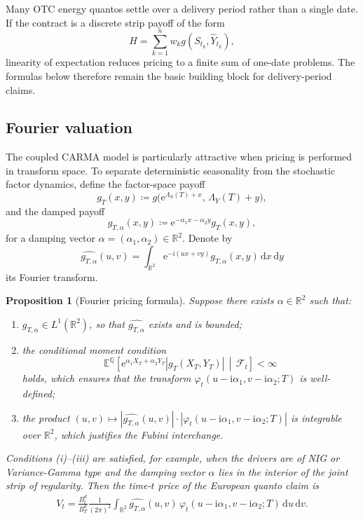 \documentclass[10pt,reqno]{amsart}
\newtheorem{proposition}[theorem]{Proposition}
\newcommand{\R}{\mathbb{R}}
\newcommand{\E}{\mathbb{E}}
\newcommand{\Q}{\mathbb{Q}}
\newcommand{\F}{\mathcal{F}}
\newcommand{\1}{\mathbbm{1}}
\newcommand{\dd}{\mathrm{d}}
\newcommand{\ii}{\mathrm{i}}
\newcommand{\ee}{\mathrm{e}}
\begin{document}
Many OTC energy quantos settle over a delivery period rather than a single date.
If the contract is a discrete strip payoff of the form
$$
H = \sum_{k=1}^n w_k g(S_{t_k},\widehat{Y}_{t_k}),
$$
linearity of expectation reduces pricing to a finite sum of one-date problems.
The formulas below therefore remain the basic building block for
delivery-period claims.

\subsection{Fourier valuation}

The coupled CARMA model is particularly attractive when pricing is performed in
transform space. To separate deterministic seasonality from the stochastic
factor dynamics, define the factor-space payoff
$$
g_T(x,y) \coloneqq g\!\bigl(\ee^{\Lambda_S(T)+x},\, \Lambda_Y(T)+y\bigr),
$$
and the damped payoff
$$
g_{T,\alpha}(x,y) \coloneqq \ee^{-\alpha_1 x-\alpha_2 y} g_T(x,y),
$$
for a damping vector $\alpha=(\alpha_1,\alpha_2)\in\R^2$. Denote by
$$
\widehat{g_{T,\alpha}}(u,v)
= \int_{\R^2} \ee^{-\ii(ux+vy)} g_{T,\alpha}(x,y)\,\dd x\,\dd y
$$
its Fourier transform.

\begin{proposition}[Fourier pricing formula]
\label{prop:fourier_pricing}
Suppose there exists $\alpha\in\R^2$ such that:
\begin{enumerate}[label=(\roman*)]
  \item $g_{T,\alpha} \in L^1(\R^2)$, so that $\widehat{g_{T,\alpha}}$
    exists and is bounded;
  \item the conditional moment condition
    $$
    \E^\Q\!\left[
      \ee^{\alpha_1 X_T + \alpha_2 Y_T}
      \left|g_T(X_T,Y_T)\right|
      \,\middle|\, \F_t
    \right] < \infty
    $$
    holds, which ensures that the transform $\varphi_t(u-\ii\alpha_1,
    v-\ii\alpha_2;T)$ is well-defined;
  \item the product $(u,v) \mapsto
    |\widehat{g_{T,\alpha}}(u,v)|\cdot|\varphi_t(u-\ii\alpha_1,v-\ii\alpha_2;T)|$
    is integrable over $\R^2$, which justifies the Fubini interchange.
\end{enumerate}
Conditions (i)--(iii) are satisfied, for example, when the drivers are of
NIG or Variance-Gamma type and the damping vector $\alpha$ lies in
the interior of the joint strip of regularity.
Then the time-$t$ price of the European quanto claim is
\begin{align}\label{eq:fourier_pricing}
  V_t
  = \frac{B_t^d}{B_T^d} \frac{1}{(2\pi)^2}
    \int_{\R^2}
      \widehat{g_{T,\alpha}}(u,v)\,
      \varphi_t(u-\ii\alpha_1,v-\ii\alpha_2;T)
      \,\dd u\,\dd v.
\end{align}
\end{proposition}
\end{document}
